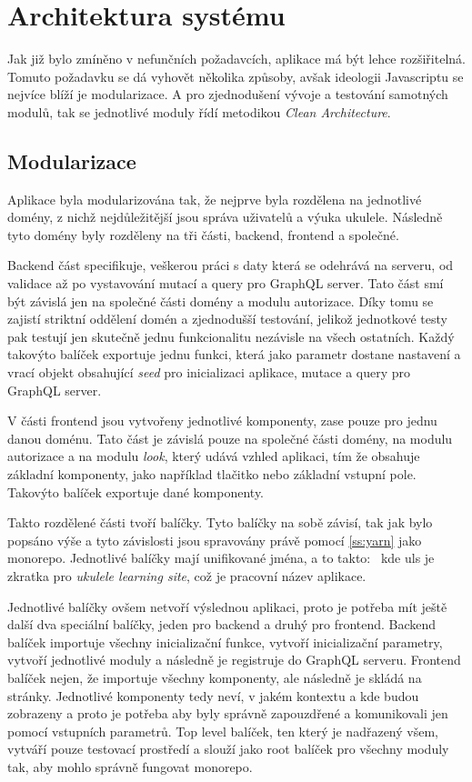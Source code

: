 \section{Architektura systému}
\label{sc:system_architecture}
Jak již bylo zmíněno v nefunčních požadavcích, aplikace má být lehce rozšiřitelná. Tomuto požadavku se dá vyhovět několika způsoby, avšak ideologii Javascriptu se nejvíce blíží je modularizace. A pro zjednodušení vývoje a testování samotných modulů, tak se jednotlivé moduly řídí metodikou \emph{Clean Architecture}.

\subsection{Modularizace}
Aplikace byla modularizována tak, že nejprve byla rozdělena na jednotlivé domény, z nichž nejdůležitější jsou správa uživatelů a výuka ukulele. Následně tyto domény byly rozděleny na tři části, backend, frontend a společné.

Backend část specifikuje, veškerou práci s daty která se odehrává na serveru, od validace až po vystavování mutací a query pro GraphQL server. Tato část smí být závislá jen na společné části domény a modulu autorizace. Díky tomu se zajistí striktní oddělení domén a zjednodušší testování, jelikož jednotkové testy pak testují jen skutečně jednu funkcionalitu nezávisle na všech ostatních. Každý takovýto balíček exportuje jednu funkci, která jako parametr dostane nastavení a vrací objekt obsahující \emph{seed} pro inicializaci aplikace, mutace a query pro GraphQL server.

V části frontend jsou vytvořeny jednotlivé komponenty, zase pouze pro jednu danou doménu. Tato část je závislá pouze na společné části domény, na modulu autorizace a na modulu \emph{look}, který udává vzhled aplikaci, tím že obsahuje základní komponenty, jako například tlačitko nebo základní vstupní pole. Takovýto balíček exportuje dané komponenty.

Takto rozdělené části tvoří balíčky. Tyto balíčky na sobě závisí, tak jak bylo popsáno výše a tyto závislosti jsou spravovány právě pomocí \ref{ss:yarn} jako monorepo. Jednotlivé balíčky mají unifikované jména, a to takto:~ kde uls je zkratka pro \emph{ukulele learning site}, což je pracovní název aplikace.

Jednotlivé balíčky ovšem netvoří výslednou aplikaci, proto je potřeba mít ještě další dva speciální balíčky, jeden pro backend a druhý pro frontend. Backend balíček importuje všechny inicializační funkce, vytvoří inicializační parametry, vytvoří jednotlivé moduly a následně je registruje do GraphQL serveru. Frontend balíček nejen, že importuje všechny komponenty, ale následně je skládá na stránky. Jednotlivé komponenty tedy neví, v jakém kontextu a kde budou zobrazeny a proto je potřeba aby byly správně zapouzdřené a komunikovali jen pomocí vstupních parametrů. Top level balíček, ten který je nadřazený všem, vytváří pouze testovací prostředí a slouží jako root balíček pro všechny moduly tak, aby mohlo správně fungovat monorepo.


